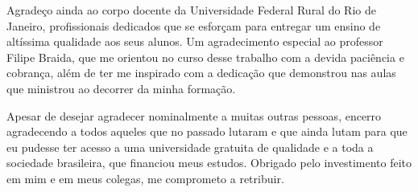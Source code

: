 Agradeço ainda ao corpo docente da Universidade Federal Rural do Rio de Janeiro, profissionais dedicados que se esforçam para entregar um ensino de altíssima qualidade aos seus alunos. Um agradecimento especial ao professor Filipe Braida, que me orientou no curso desse trabalho com a devida paciência e cobrança, além de ter me inspirado com a dedicação que demonstrou nas aulas que ministrou ao decorrer da minha formação.

Apesar de desejar agradecer nominalmente a muitas outras pessoas, encerro agradecendo a todos aqueles que no passado lutaram e que ainda lutam para que eu pudesse ter acesso a uma universidade gratuita de qualidade e a toda a sociedade brasileira, que financiou meus estudos. Obrigado pelo investimento feito em mim e em meus colegas, me comprometo a retribuir.

